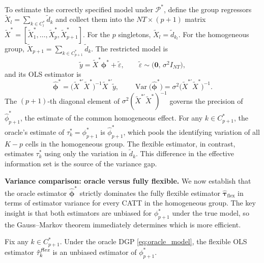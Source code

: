 \documentclass[margin=3in, 12pt]{article}
\DeclareMathOperator{\Var}{Var}
\newcommand{\1}{\mathbbm{1}}
\newcommand{\ytd}{\tilde{y}}
\newcommand{\Xtd}{\tilde{X}}
\begin{document}
To estimate the correctly specified model under $\mathcal{P}^*$, define the
group regressors $\Xtd_l = \sum_{k \in C_l^*} \tilde{d}_k$ and collect them
into the $NT \times (p+1)$ matrix
$\Xtd^* = [\tilde{X}_1^*, \ldots, \tilde{X}_p^*, \tilde{X}_{p+1}^*]$.
For the $p$ singletons, $\Xtd_l = \tilde{d}_{k_l}$.
For the homogeneous group, $\Xtd_{p+1} = \sum_{k \in C_{p+1}^*} \tilde{d}_k$.
The restricted model is
\begin{equation}
  \ytd = \Xtd^*\bm{\phi}^* + \tilde{\varepsilon},
  \qquad
  \tilde{\varepsilon} \sim \bigl(\mathbf{0},\,\sigma^2 I_{NT}\bigr),
  \label{eq:oracle_model}
\end{equation}
and its OLS estimator is
\begin{equation}
  \hat{\bm{\phi}}^* = \bigl(\Xtd^{*\prime}\Xtd^*\bigr)^{-1}\Xtd^{*\prime}\ytd,
  \qquad
  \Var\!\bigl(\hat{\bm{\phi}}^*\bigr)
  = \sigma^2\bigl(\Xtd^{*\prime}\Xtd^*\bigr)^{-1}.
  \label{eq:oracle_var}
\end{equation}
The $(p+1)$-th diagonal element of $\sigma^2(\Xtd^{*\prime}\Xtd^*)^{-1}$
governs the precision of $\hat\phi_{p+1}^*$, the estimate of the common
homogeneous effect.
For any $k \in C_{p+1}^*$, the oracle's estimate of $\tau_k^* =
\phi_{p+1}^*$ is $\hat\phi_{p+1}^*$, which pools the identifying variation
of all $K-p$ cells in the homogeneous group.
The flexible estimator, in contrast, estimates $\tau_k^*$ using only
the variation in $\tilde{d}_k$.
This difference in the effective information set is the source of the
variance gap.

\bigskip

\noindent\textbf{Variance comparison: oracle versus fully flexible.}
We now establish that the oracle estimator $\hat{\bm{\phi}}^*$ strictly
dominates the fully flexible estimator $\hat{\bm{\tau}}_{\text{flex}}$
in terms of estimator variance for every CATT in the homogeneous group.
The key insight is that both estimators are unbiased for $\phi_{p+1}^*$
under the true model, so the Gauss--Markov theorem immediately determines
which is more efficient.

\begin{lemma}
  \label{lem:unbiased}
  Fix any $k \in C_{p+1}^*$.  Under the oracle DGP
  \eqref{eq:oracle_model}, the flexible OLS estimator $\hat\tau_k^{\emph{flex}}$
  is an unbiased estimator of $\phi_{p+1}^*$.
\end{lemma}
\end{document}
